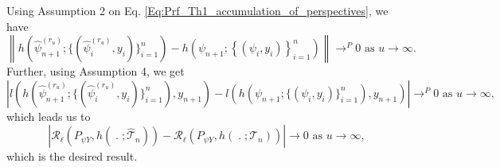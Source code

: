 \documentclass[11pt]{article}
\begin{document}
 Using Assumption 2 on Eq. \ref{Eq:Prf_Th1_accumulation_of_perspectives}, we have
 \begin{equation*}
     \left\lVert
h (\widehat{\psi}_{n+1}^{(r_u)};
\lbrace (\widehat{\psi}_i^{(r_u)},y_i) \rbrace_{i=1}^n
)-
h \left(\psi_{n+1};
\left\lbrace (\psi_i,y_i) \right\rbrace_{i=1}^n
\right)
\right\rVert \to^P 0 \text{ as $u \to \infty$}.
 \end{equation*}
 Further, using Assumption 4, we get 
 \begin{equation*}
 \left|
     l(h (\widehat{\psi}_{n+1}^{(r_u)};
\lbrace (\widehat{\psi}_i^{(r_u)},y_i) \rbrace_{i=1}^n
),y_{n+1}
)-
l(
h (\psi_{n+1};
\lbrace (\psi_i,y_i) \rbrace_{i=1}^n
),y_{n+1}
)
\right| \to^P 0
\text{ as $u \to \infty$,}
 \end{equation*}
 which leads us to
 \begin{equation*}
 \left|
\mathcal{R}_{\ell}(P_{\psi Y},h(\;.\;;\widehat{\mathcal{T}}_n))-
\mathcal{R}_{\ell}(P_{\psi Y},h(\;.\;;\mathcal{T}_n)) 
\right| \to 0 
\text{ as $u \to \infty$},
 \end{equation*}
which is the desired result.
\end{document}
